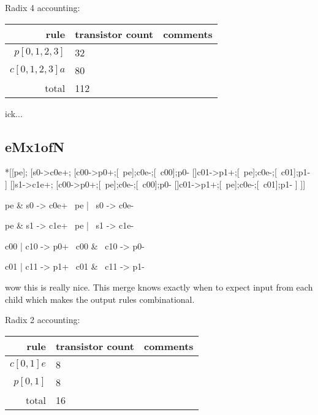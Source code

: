 \documentclass{article}
\begin{document}
\noindent Radix 4 accounting: 

\begin{center}
    \begin{tabular}{|r|l|l|}
    \hline
    rule & transistor count & comments \\ \hline
    $p[0,1,2,3]$ & 32 & \\ \hline
    $c[0,1,2,3]a$ & 80 & \\ \hline
    \hline total & 112 & \\ \hline
    \end{tabular}
\end{center}

ick...

\subsection{eMx1ofN}

\begin{hse}
*[[pe];
  [s0->c0e+;
    [c00->p0+;[~pe];c0e-;[~c00];p0-
    []c01->p1+;[~pe];c0e-;[~c01];p1-
    ]
  []s1->c1e+;
    [c00->p0+;[~pe];c0e-;[~c00];p0-
    []c01->p1+;[~pe];c0e-;[~c01];p1-
    ]
 ]]
\end{hse}

\begin{prs2}
pe & s0 -> c0e+
~pe | ~s0 -> c0e-

pe & s1 -> c1e+
~pe | ~s1 -> c1e-
\end{prs2}

\begin{prs2}
c00 | c10 -> p0+
~c00 & ~c10 -> p0-

c01 | c11 -> p1+
~c01 & ~c11 -> p1-
\end{prs2}

wow this is really nice. This merge knows exactly when to expect input from each child which makes the output rules combinational.

\noindent Radix 2 accounting: 

\begin{center}
    \begin{tabular}{|r|l|l|}
    \hline
    rule & transistor count & comments \\ \hline
    $c[0,1]e$ & 8 & \\ \hline
    $p[0,1]$ & 8 & \\ \hline
    \hline total & 16 & \\ \hline
    \end{tabular}
\end{center}
\end{document}
